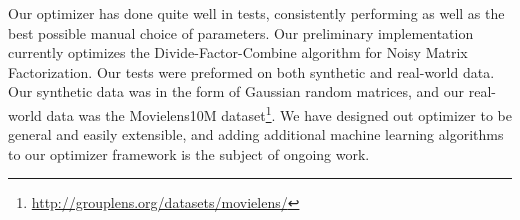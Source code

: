 Our optimizer has done quite well in tests, consistently performing as 
well as the best possible manual choice of parameters. Our preliminary 
implementation currently optimizes the Divide-Factor-Combine algorithm 
for Noisy Matrix Factorization. Our tests were preformed on both synthetic 
and real-world data. Our synthetic data was in the form of Gaussian 
random matrices, and our real-world data was the Movielens10M 
dataset\footnote{\url{http://grouplens.org/datasets/movielens/}}. We have designed out optimizer to be general and easily 
extensible, and adding additional machine learning algorithms to our 
optimizer framework is the subject of ongoing work.
